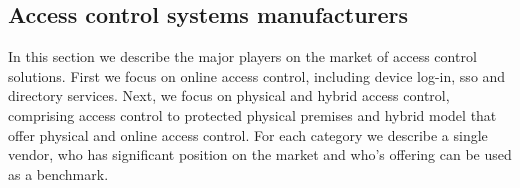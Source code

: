 \subsection{Access control systems manufacturers} \label{competitors_sota}

In this section we describe the major players on the market of access control solutions. First we focus on online access control, including device log-in, \acrshort{sso} and directory services. Next, we focus on physical and hybrid access control, comprising access control to protected physical premises and hybrid model that offer physical and online access control. For each category we describe a single vendor, who has significant position on the market and who's offering can be used as a benchmark.


